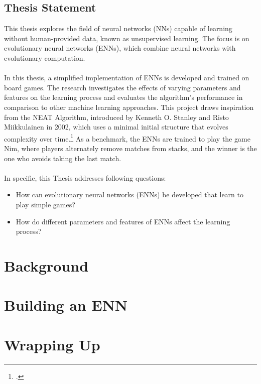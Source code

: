 \documentclass[12pt]{report}
\begin{document}
    \section{Thesis Statement}\label{sec:thesis-statement}
    This thesis explores the field of neural networks (NNs) capable of learning without human-provided data, known as unsupervised learning.
    The focus is on evolutionary neural networks (ENNs), which combine neural networks with evolutionary computation.
    \\ \\
    In this thesis, a simplified implementation of ENNs is developed and trained on board games.
    The research investigates the effects of varying parameters and features on the learning process and evaluates the algorithm’s performance in comparison to other machine learning approaches.
    This project draws inspiration from the NEAT Algorithm, introduced by Kenneth O. Stanley and Risto Miikkulainen in 2002, which uses a minimal initial structure that evolves complexity over time.\footcite[p.105-106]{Neat_02}
    As a benchmark, the ENNs are trained to play the game Nim, where players alternately remove matches from stacks, and the winner is the one who avoids taking the last match.
    \\ \\
    In specific, this Thesis addresses following questions:
    \begin{itemize}
        \item How can evolutionary neural networks (ENNs) be developed that learn to play simple games?
        \item How do different parameters and features of ENNs affect the learning process?
    \end{itemize}


    \chapter{Background}\label{ch:background}
    


    \chapter{Building an ENN}\label{ch:designing-an-enn}
    


    \chapter{Wrapping Up}\label{ch:wrapping-up}
    
\end{document}
